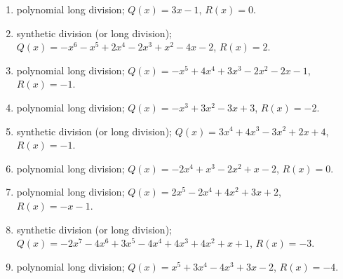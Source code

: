 \documentclass[11pt,oneside]{book}
\begin{document}
\begin{enumerate}[leftmargin=*,label=\textbf{Q\arabic*.},itemsep=0.45\baselineskip]
\item polynomial long division; $Q(x)=3 x - 1$, $R(x)=0$.
\item synthetic division (or long division); $Q(x)=- x^{6} - x^{5} + 2 x^{4} - 2 x^{3} + x^{2} - 4 x - 2$, $R(x)=2$.
\item polynomial long division; $Q(x)=- x^{5} + 4 x^{4} + 3 x^{3} - 2 x^{2} - 2 x - 1$, $R(x)=-1$.
\item polynomial long division; $Q(x)=- x^{3} + 3 x^{2} - 3 x + 3$, $R(x)=-2$.
\item synthetic division (or long division); $Q(x)=3 x^{4} + 4 x^{3} - 3 x^{2} + 2 x + 4$, $R(x)=-1$.
\item polynomial long division; $Q(x)=- 2 x^{4} + x^{3} - 2 x^{2} + x - 2$, $R(x)=0$.
\item polynomial long division; $Q(x)=2 x^{5} - 2 x^{4} + 4 x^{2} + 3 x + 2$, $R(x)=- x - 1$.
\item synthetic division (or long division); $Q(x)=- 2 x^{7} - 4 x^{6} + 3 x^{5} - 4 x^{4} + 4 x^{3} + 4 x^{2} + x + 1$, $R(x)=-3$.
\item polynomial long division; $Q(x)=x^{5} + 3 x^{4} - 4 x^{3} + 3 x - 2$, $R(x)=-4$.
\end{enumerate}
\end{document}
